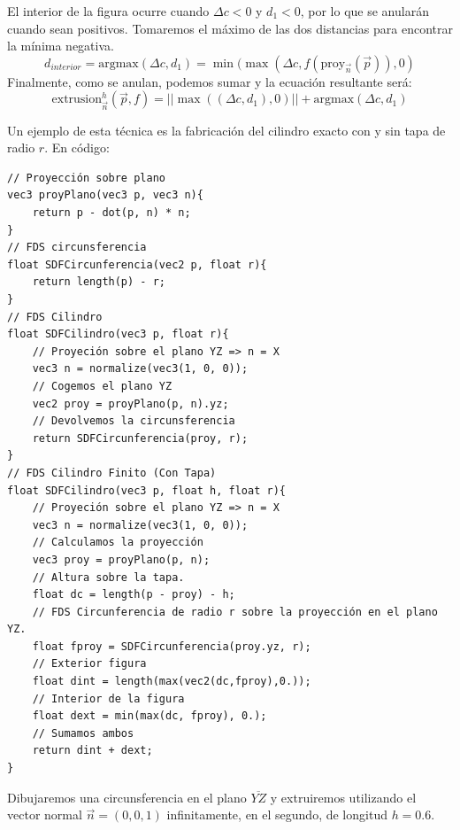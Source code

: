 El interior de la figura ocurre cuando \(\Delta c < 0\) y \(d_1 < 0\), por lo que se anularán cuando sean positivos. Tomaremos el máximo de las dos distancias para encontrar la mínima negativa.
\[d_{interior} = \text{argmax}(\Delta c, d_1) = \min(\max(\Delta c, f(\text{proy}_{\Vec{n}}(\Vec{p})), 0)\]
Finalmente, como se anulan, podemos sumar y la ecuación resultante será:
\[\text{extrusion}^h_{\Vec{n}}\left(\Vec{p},f\right)=\vert\vert \max((\Delta c, d_1), 0)\vert\vert +  \text{argmax}(\Delta c, d_1) \]

Un ejemplo de esta técnica es la fabricación del cilindro exacto con y sin tapa de radio \(r\). En código:
\begin{lstlisting}
// Proyección sobre plano
vec3 proyPlano(vec3 p, vec3 n){
    return p - dot(p, n) * n;
}
// FDS circunsferencia
float SDFCircunferencia(vec2 p, float r){
	return length(p) - r;
}
// FDS Cilindro
float SDFCilindro(vec3 p, float r){
    // Proyeción sobre el plano YZ => n = X
    vec3 n = normalize(vec3(1, 0, 0));
    // Cogemos el plano YZ
    vec2 proy = proyPlano(p, n).yz;
    // Devolvemos la circunsferencia
    return SDFCircunferencia(proy, r);
}
// FDS Cilindro Finito (Con Tapa)
float SDFCilindro(vec3 p, float h, float r){
    // Proyeción sobre el plano YZ => n = X
    vec3 n = normalize(vec3(1, 0, 0));
    // Calculamos la proyección
    vec3 proy = proyPlano(p, n);
    // Altura sobre la tapa.
    float dc = length(p - proy) - h;
    // FDS Circunferencia de radio r sobre la proyección en el plano YZ.
    float fproy = SDFCircunferencia(proy.yz, r);
    // Exterior figura
    float dint = length(max(vec2(dc,fproy),0.));
    // Interior de la figura
    float dext = min(max(dc, fproy), 0.);
    // Sumamos ambos
    return dint + dext;
}
\end{lstlisting}

Dibujaremos una circunsferencia en el plano \(\overline{YZ}\) y extruiremos utilizando el vector normal \(\Vec{n}=(0,0,1)\) infinitamente, en el segundo, de longitud \(h=0.6\).

